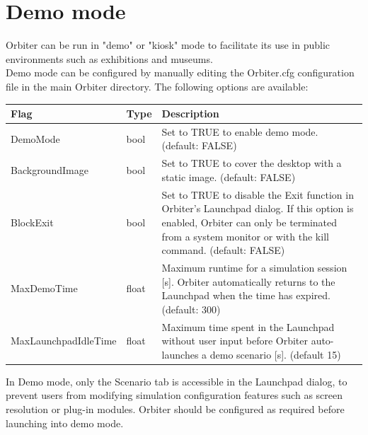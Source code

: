 \documentclass[Orbiter User Manual.tex]{subfiles}
\begin{document}
\section{Demo mode}
\label{sec:demo}
Orbiter can be run in "demo" or "kiosk" mode to facilitate its use in public environments such as exhibitions and museums.\\
Demo mode can be configured by manually editing the Orbiter.cfg configuration file in the main Orbiter directory. The following options are available:

	\begin{longtable}{ |p{}|p{}|p{}| }
	\hline\rule{0pt}{2ex}
	\textbf{Flag} & \textbf{Type} & \textbf{Description}\\
	\hline\rule{0pt}{2ex}
	DemoMode & bool & Set to TRUE to enable demo mode. (default: FALSE)\\
	\hline\rule{0pt}{2ex}
	BackgroundImage & bool & Set to TRUE to cover the desktop with a static image. (default: FALSE)\\
	\hline\rule{0pt}{2ex}
	BlockExit & bool & Set to TRUE to disable the Exit function in Orbiter's Launchpad dialog. If this option is enabled, Orbiter can only be terminated from a system monitor or with the kill command. (default: FALSE)\\
	\hline\rule{0pt}{2ex}
	MaxDemoTime & float & Maximum runtime for a simulation session [s]. Orbiter automatically returns to the Launchpad when the time has expired. (default: 300)\\
	\hline\rule{0pt}{2ex}
	MaxLaunchpadIdleTime & float & Maximum time spent in the Launchpad without user input before Orbiter auto-launches a demo scenario [s]. (default 15)\\
	\hline
	\end{longtable}

\noindent
In Demo mode, only the Scenario tab is accessible in the Launchpad dialog, to prevent users from modifying simulation configuration features such as screen resolution or plug-in modules. Orbiter should be configured as required before launching into demo mode.\\


\end{document}
